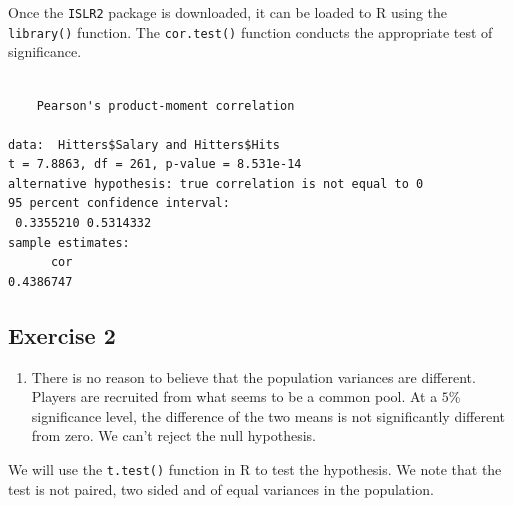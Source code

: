 \documentclass[
  letterpaper,
  DIV=11,
  numbers=noendperiod]{scrreprt}
\newenvironment{Shaded}{\begin{snugshade}}{\end{snugshade}}
\newcommand{\AttributeTok}[1]{\textcolor[rgb]{0.40,0.45,0.13}{#1}}
\newcommand{\DecValTok}[1]{\textcolor[rgb]{0.68,0.00,0.00}{#1}}
\newcommand{\FloatTok}[1]{\textcolor[rgb]{0.68,0.00,0.00}{#1}}
\newcommand{\FunctionTok}[1]{\textcolor[rgb]{0.28,0.35,0.67}{#1}}
\newcommand{\NormalTok}[1]{\textcolor[rgb]{0.00,0.23,0.31}{#1}}
\newcommand{\SpecialCharTok}[1]{\textcolor[rgb]{0.37,0.37,0.37}{#1}}
\newcommand{\StringTok}[1]{\textcolor[rgb]{0.13,0.47,0.30}{#1}}
\providecommand{\tightlist}{%
  \setlength{\itemsep}{0pt}\setlength{\parskip}{0pt}}\usepackage{longtable,booktabs,array}
\begin{document}
Once the \texttt{ISLR2} package is downloaded, it can be loaded to R
using the \texttt{library()} function. The \texttt{cor.test()} function
conducts the appropriate test of significance.

\begin{Shaded}
\end{Shaded}

\begin{verbatim}

    Pearson's product-moment correlation

data:  Hitters$Salary and Hitters$Hits
t = 7.8863, df = 261, p-value = 8.531e-14
alternative hypothesis: true correlation is not equal to 0
95 percent confidence interval:
 0.3355210 0.5314332
sample estimates:
      cor 
0.4386747 
\end{verbatim}

\hypertarget{exercise-2-27}{%
\subsection*{Exercise 2}\label{exercise-2-27}}

\begin{blackbox}

\begin{enumerate}
\def\labelenumi{\arabic{enumi}.}
\tightlist
\item
  There is no reason to believe that the population variances are
  different. Players are recruited from what seems to be a common pool.
  At a \(5\)\% significance level, the difference of the two means is
  not significantly different from zero. We can't reject the null
  hypothesis.
\end{enumerate}

\end{blackbox}

We will use the \texttt{t.test()} function in R to test the hypothesis.
We note that the test is not paired, two sided and of equal variances in
the population.

\begin{Shaded}
\end{Shaded}
\end{document}
